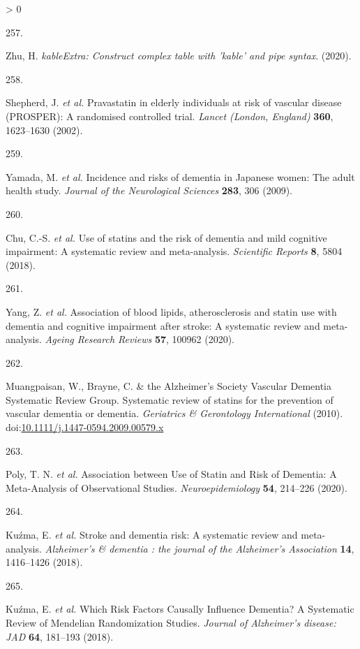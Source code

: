 \documentclass[a4paper, twoside]{templates/ociamthesis}
\newlength{\cslhangindent}
\newlength{\csllabelwidth}
\newenvironment{CSLReferences}[3] %
 {%
  \setlength{\parindent}{0pt}
  \ifodd #1 \everypar{\setlength{\hangindent}{\cslhangindent}}\ignorespaces\fi
  \ifnum #2 > 0
  \setlength{\parskip}{#2\baselineskip}
  \fi
 }%
 {}
\newcommand{\CSLLeftMargin}[1]{\parbox[t]{\maxof{\widthof{#1}}{\csllabelwidth}}{#1}}
\newcommand{\CSLRightInline}[1]{\parbox[t]{\linewidth - \csllabelwidth}{#1}}
\begin{document}
\begin{CSLReferences}{0}{0}
\leavevmode\hypertarget{ref-zhu2020}{}%
\CSLLeftMargin{257. }
\CSLRightInline{Zhu, H. \emph{{kableExtra}: Construct complex table with 'kable' and pipe syntax}. (2020).}

\leavevmode\hypertarget{ref-shepherd2002}{}%
\CSLLeftMargin{258. }
\CSLRightInline{Shepherd, J. \emph{et al.} Pravastatin in elderly individuals at risk of vascular disease ({PROSPER}): A randomised controlled trial. \emph{Lancet (London, England)} \textbf{360}, 1623--1630 (2002).}

\leavevmode\hypertarget{ref-yamada2009conf}{}%
\CSLLeftMargin{259. }
\CSLRightInline{Yamada, M. \emph{et al.} Incidence and risks of dementia in {Japanese} women: The adult health study. \emph{Journal of the Neurological Sciences} \textbf{283}, 306 (2009).}

\leavevmode\hypertarget{ref-chu2018}{}%
\CSLLeftMargin{260. }
\CSLRightInline{Chu, C.-S. \emph{et al.} Use of statins and the risk of dementia and mild cognitive impairment: A systematic review and meta-analysis. \emph{Scientific Reports} \textbf{8}, 5804 (2018).}

\leavevmode\hypertarget{ref-yang2020}{}%
\CSLLeftMargin{261. }
\CSLRightInline{Yang, Z. \emph{et al.} Association of blood lipids, atherosclerosis and statin use with dementia and cognitive impairment after stroke: A systematic review and meta-analysis. \emph{Ageing Research Reviews} \textbf{57}, 100962 (2020).}

\leavevmode\hypertarget{ref-muangpaisan2010}{}%
\CSLLeftMargin{262. }
\CSLRightInline{Muangpaisan, W., Brayne, C. \& the Alzheimer's Society Vascular Dementia Systematic Review Group. Systematic review of statins for the prevention of vascular dementia or dementia. \emph{Geriatrics \& Gerontology International} (2010). doi:\href{https://doi.org/10.1111/j.1447-0594.2009.00579.x}{10.1111/j.1447-0594.2009.00579.x}}

\leavevmode\hypertarget{ref-poly2020}{}%
\CSLLeftMargin{263. }
\CSLRightInline{Poly, T. N. \emph{et al.} Association between {Use} of {Statin} and {Risk} of {Dementia}: A {Meta}-{Analysis} of {Observational Studies}. \emph{Neuroepidemiology} \textbf{54}, 214--226 (2020).}

\leavevmode\hypertarget{ref-kuzma2018stroke}{}%
\CSLLeftMargin{264. }
\CSLRightInline{Kuźma, E. \emph{et al.} Stroke and dementia risk: A systematic review and meta-analysis. \emph{Alzheimer's \& dementia : the journal of the Alzheimer's Association} \textbf{14}, 1416--1426 (2018).}

\leavevmode\hypertarget{ref-kuzma2018risk}{}%
\CSLLeftMargin{265. }
\CSLRightInline{Kuźma, E. \emph{et al.} Which {Risk Factors Causally Influence Dementia}? A {Systematic Review} of {Mendelian Randomization Studies}. \emph{Journal of Alzheimer's disease: JAD} \textbf{64}, 181--193 (2018).}


\end{CSLReferences}
\end{document}

